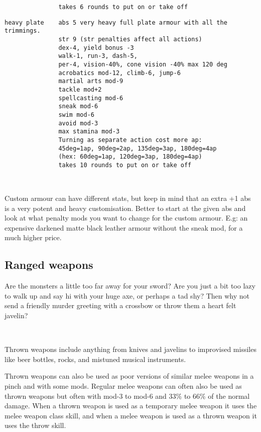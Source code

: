\begin{samepage}
\begin{verbatim}
               takes 6 rounds to put on or take off
\end{verbatim} \blocklistgap \begin{verbatim}
heavy plate    abs 5 very heavy full plate armour with all the trimmings.
               str 9 (str penalties affect all actions)
               dex-4, yield bonus -3
               walk-1, run-3, dash-5,
               per-4, vision-40%, cone vision -40% max 120 deg
               acrobatics mod-12, climb-6, jump-6
               martial arts mod-9
               tackle mod+2
               spellcasting mod-6
               sneak mod-6
               swim mod-6
               avoid mod-3
               max stamina mod-3
               Turning as separate action cost more ap:
               45deg=1ap, 90deg=2ap, 135deg=3ap, 180deg=4ap
               (hex: 60deg=1ap, 120deg=3ap, 180deg=4ap)
               takes 10 rounds to put on or take off
\end{verbatim} \end{samepage} \normalsize \goodbreak

\

Custom armour can have different stats, but keep in mind that an extra +1 abs is a very potent and heavy customisation. Better to start at the given abs and look at what penalty mods you want to change for the custom armour. E.g: an expensive darkened matte black leather armour without the sneak mod, for a much higher price.


\subsection*{Ranged weapons}
Are the monsters a little too far away for your sword? Are you just a bit too lazy to walk up and say hi with your huge axe, or perhaps a tad shy? Then why not send a friendly murder greeting with a crossbow or throw them a heart felt javelin?

\

\noindent Thrown weapons include anything from knives and javelins to improvised missiles like beer bottles, rocks, and mistuned musical instruments.

Thrown weapons can also be used as poor versions of similar melee weapons in a pinch and with some mods. Regular melee weapons can often also be used as thrown weapons but often with mod-3 to mod-6 and 33\% to 66\% of the normal damage. When a thrown weapon is used as a temporary melee weapon it uses the melee weapon class skill, and when a melee weapon is used as a thrown weapon it uses the throw skill.

